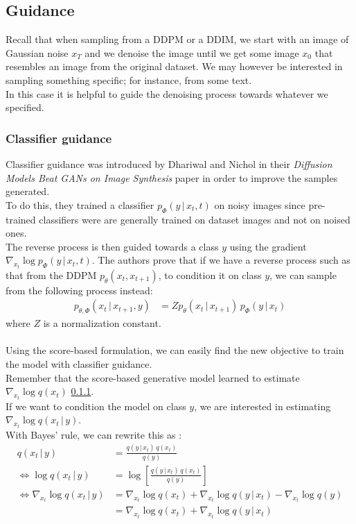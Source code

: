 \documentclass{article}
\begin{document}
\subsection{Guidance}
Recall that when sampling from a DDPM or a DDIM, we start with an image of Gaussian noise $x_T$ and we denoise the image until we get some image $x_0$ that resembles an image from the original dataset. We may however be interested in sampling something specific; for instance, from some text. \\
In this case it is helpful to guide the denoising process towards whatever we specified.
\subsubsection{Classifier guidance}
Classifier guidance was introduced by Dhariwal and Nichol in their \textit{Diffusion Models Beat GANs on Image Synthesis} paper \cite{dhariwal2021diffusion} in order to improve the samples generated. \\
To do this, they trained a classifier $p_\Phi (y \, | \, x_t, t)$ on noisy images \cite{dhariwal2021diffusion} since pre-trained classifiers were are generally trained on dataset images and not on noised ones. \\
The reverse process is then guided towards a class $y$ using the gradient $\nabla_{x_t} \log p_\Phi (y \, | \, x_t, t)$. \cite{dhariwal2021diffusion}
The authors prove \cite{dhariwal2021diffusion} that if we have a reverse process such as that from the DDPM $p_\theta (x_t, x_{t+1})$, to condition it on class $y$, we can sample from the following process instead:
\begin{align}
  p_{\theta, \Phi} (x_t \, | \, x_{t+1}, y) &= Z p_\theta (x_t \, | \, x_{t+1}) \, p_\Phi(y \, | \, x_t)
\end{align}
where $Z$ is a normalization constant.
\\\\
Using the score-based formulation, we can easily find the new objective to train the model with classifier guidance. \cite{luo2022understanding} \\
Remember that the score-based generative model learned to estimate $\nabla_{x_t} \log q(x_t)$ \ref{}. \\
If we want to condition the model on class $y$, we are interested in estimating $\nabla_{x_t} \log q(x_t \, | \, y)$. \cite{luo2022understanding} \\
With Bayes' rule, we can rewrite this as \cite{luo2022understanding}:
\begin{align}
  q(x_t \, | \, y) &= \frac{q(y \, | \, x_t) \, q(x_t)}{q(y)}\\
  \Leftrightarrow \log q(x_t \, | \, y) &= \log \left[ \frac{q(y \, | \, x_t) \, q(x_t)}{q(y)} \right] \\
  \Leftrightarrow \nabla_{x_t} \log q(x_t \, | \, y) &= \nabla_{x_t} \log q(x_t) + \nabla_{x_t} \log q(y \, | \, x_t) - \nabla_{x_t} \log q(y) \\
  &= \nabla_{x_t} \log q(x_t) + \nabla_{x_t} \log q(y \, | \, x_t)
\end{align}
\end{document}
